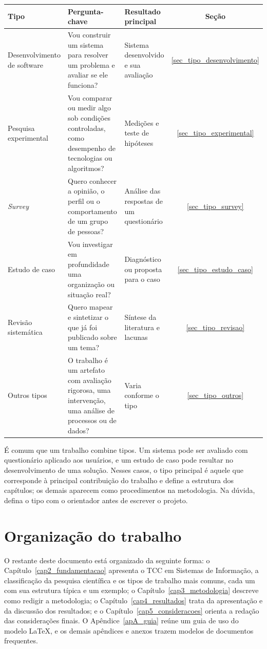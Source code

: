 \begin{quadro}[htb]
	\centering
	\caption{Síntese dos tipos de trabalho para apoiar a escolha.}
	\label{qua_escolha_tipo}
	\small
	\begin{tabularx}{\textwidth}{|>{\raggedright\arraybackslash}p{3cm}|X|>{\raggedright\arraybackslash}p{3.1cm}|c|}
		\hline
		\textbf{Tipo} & \textbf{Pergunta-chave} & \textbf{Resultado principal} & \textbf{Seção} \\ \hline
		Desenvolvimento de software & Vou construir um sistema para resolver um problema e avaliar se ele funciona? & Sistema desenvolvido e sua avaliação & \ref{sec_tipo_desenvolvimento} \\ \hline
		Pesquisa experimental & Vou comparar ou medir algo sob condições controladas, como desempenho de tecnologias ou algoritmos? & Medições e teste de hipóteses & \ref{sec_tipo_experimental} \\ \hline
		\textit{Survey} & Quero conhecer a opinião, o perfil ou o comportamento de um grupo de pessoas? & Análise das respostas de um questionário & \ref{sec_tipo_survey} \\ \hline
		Estudo de caso & Vou investigar em profundidade uma organização ou situação real? & Diagnóstico ou proposta para o caso & \ref{sec_tipo_estudo_caso} \\ \hline
		Revisão sistemática & Quero mapear e sintetizar o que já foi publicado sobre um tema? & Síntese da literatura e lacunas & \ref{sec_tipo_revisao} \\ \hline
		Outros tipos & O trabalho é um artefato com avaliação rigorosa, uma intervenção, uma análise de processos ou de dados? & Varia conforme o tipo & \ref{sec_tipo_outros} \\ \hline
	\end{tabularx}
\end{quadro}

É comum que um trabalho combine tipos. Um sistema pode ser avaliado com questionário aplicado aos usuários, e um estudo de caso pode resultar no desenvolvimento de uma solução. Nesses casos, o tipo principal é aquele que corresponde à principal contribuição do trabalho e define a estrutura dos capítulos; os demais aparecem como procedimentos na metodologia. Na dúvida, defina o tipo com o orientador antes de escrever o projeto.

\section{Organização do trabalho}

O restante deste documento está organizado da seguinte forma: o Capítulo~\ref{cap2_fundamentacao} apresenta o TCC em Sistemas de Informação, a classificação da pesquisa científica e os tipos de trabalho mais comuns, cada um com sua estrutura típica e um exemplo; o Capítulo~\ref{cap3_metodologia} descreve como redigir a metodologia; o Capítulo~\ref{cap4_resultados} trata da apresentação e da discussão dos resultados; e o Capítulo~\ref{cap5_consideracoes} orienta a redação das considerações finais. O Apêndice~\ref{apA_guia} reúne um guia de uso do modelo \LaTeX{}, e os demais apêndices e anexos trazem modelos de documentos frequentes.
